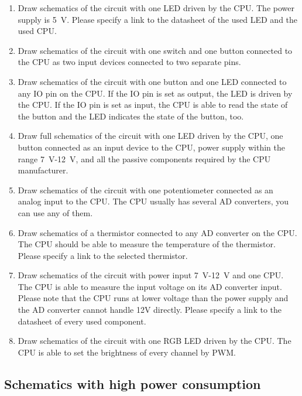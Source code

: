 \documentclass[12pt, a4paper]{article}
\begin{document}
\begin{enumerate}
	\item Draw schematics of the circuit with one LED driven by the CPU. The power supply is \SI{5}{V}. Please specify a link to the datasheet of the used LED and the used CPU.
	
	\item Draw schematics of the circuit with one switch and one button connected to the CPU as two input devices connected to two separate pins.
	
	\item Draw schematics of the circuit with one button and one LED connected to any IO pin on the CPU. If the IO pin is set as output, the LED is driven by the CPU. If the IO pin is set as input, the CPU is able to read the state of the button and the LED indicates the state of the button, too.
	
	\item Draw full schematics of the circuit with one LED driven by the CPU, one button connected as an input device to the CPU, power supply within the range \SI{7}{V}-\SI{12}{V}, and all the passive components required by the CPU manufacturer.
	
	\item Draw schematics of the circuit with one potentiometer connected as an analog input to the CPU. The CPU usually has several AD converters, you can use any of them.
	
	\item Draw schematics of a thermistor connected to any AD converter on the CPU. The CPU should be able to measure the temperature of the thermistor. Please specify a link to the selected thermistor.
	
	\item Draw schematics of the circuit with power input \SI{7}{V}-\SI{12}{V} and one CPU. The CPU is able to measure the input voltage on its AD converter input. Please note that the CPU runs at lower voltage than the power supply and the AD converter cannot handle 12V directly. Please specify a link to the datasheet of every used component.
	
	\item Draw schematics of the circuit with one RGB LED driven by the CPU. The CPU is able to set the brightness of every channel by PWM.
\end{enumerate}
	
\subsection{Schematics with high power consumption}
\end{document}
